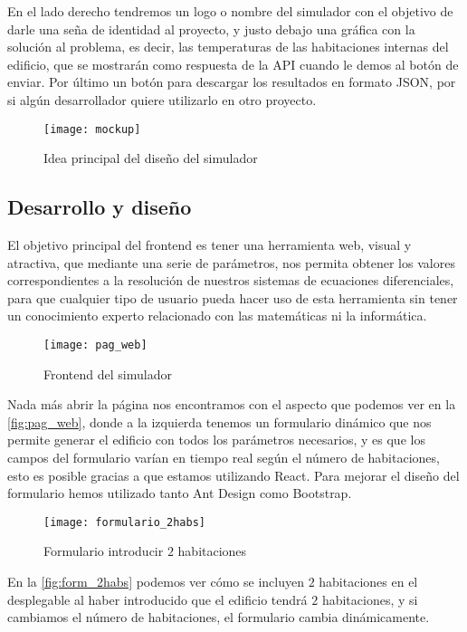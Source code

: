 En el lado derecho tendremos un logo o nombre del simulador con el objetivo de darle una seña de identidad al proyecto, y justo debajo una gráfica con la solución al problema, es decir, las temperaturas de las habitaciones internas del edificio, que se mostrarán como respuesta de la API cuando le demos al botón de enviar. Por último un botón para descargar los resultados en formato JSON, por si algún desarrollador quiere utilizarlo en otro proyecto.
\begin{figure}[h!]
	\centering
	\texttt{[image: mockup]}
	\caption{Idea principal del diseño del simulador}
	\label{fig:mockup}
\end{figure}
\subsection{Desarrollo y diseño}
El objetivo principal del frontend es tener una herramienta web, visual y atractiva, que mediante una serie de parámetros, nos permita obtener los valores correspondientes a la resolución de nuestros sistemas de ecuaciones diferenciales, para que cualquier tipo de usuario pueda hacer uso de esta herramienta sin tener un conocimiento experto relacionado con las matemáticas ni la informática.
\begin{figure}[h!]
	\centering
	\texttt{[image: pag\_web]}
	\caption{Frontend del simulador}
	\label{fig:pag_web}
\end{figure}

Nada más abrir la página nos encontramos con el aspecto que podemos ver en la \autoref{fig:pag_web}, donde a la izquierda tenemos un formulario dinámico que nos permite generar el edificio con todos los parámetros necesarios, y es que los campos del formulario varían en tiempo real según el número de habitaciones, esto es posible gracias a que estamos utilizando React. Para mejorar el diseño del formulario hemos utilizado tanto Ant Design como Bootstrap.
\begin{figure}[h!]
	\centering
	\texttt{[image: formulario\_2habs]}
	\caption{Formulario introducir $2$ habitaciones}
	\label{fig:form_2habs}
\end{figure}
En la \autoref{fig:form_2habs} podemos ver cómo se incluyen $2$ habitaciones en el desplegable al haber introducido que el edificio tendrá $2$ habitaciones, y si cambiamos el número de habitaciones, el formulario cambia dinámicamente.


